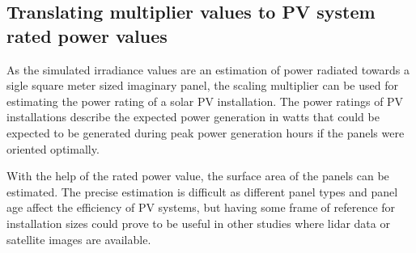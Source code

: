 








\newpage

\subsection{Translating multiplier values to PV system rated power values}
As the simulated irradiance values are an estimation of power radiated towards a sigle square meter sized imaginary panel, the scaling multiplier can be used for estimating the power rating of a solar PV installation. The power ratings of PV installations describe the expected power generation in watts that could be expected to be generated during peak power generation hours if the panels were oriented optimally.

With the help of the rated power value, the surface area of the panels can be estimated. The precise estimation is difficult as different panel types and panel age affect the efficiency of PV systems, but having some frame of reference for installation sizes could prove to be useful in other studies where lidar data or satellite images are available.

